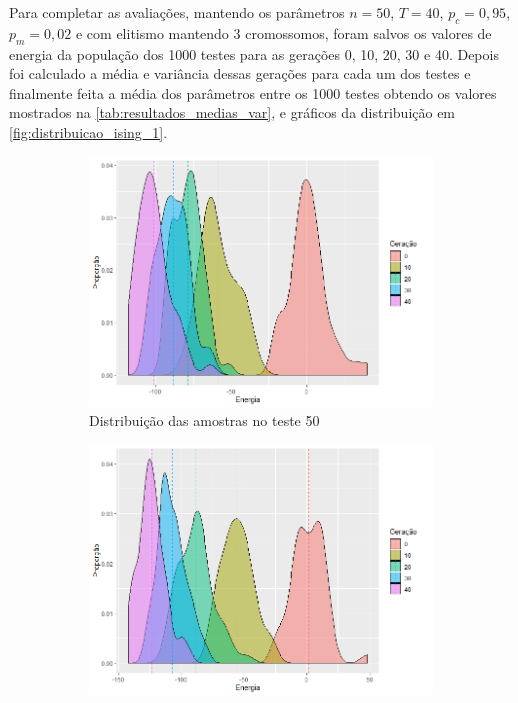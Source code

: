 Para completar as avaliações, mantendo os parâmetros \(n = 50\), \(T = 40\), \(p_c = 0,95\), \(p_m = 0,02\) e com elitismo mantendo 3 cromossomos, foram salvos os valores de energia da população dos 1000 testes para as gerações 0, 10, 20, 30 e 40. Depois foi calculado a média e variância dessas gerações para cada um dos testes e finalmente feita a média dos parâmetros entre os 1000 testes obtendo os valores mostrados na \autoref{tab:resultados_medias_var}, e gráficos da distribuição em \autoref{fig:distribuicao_ising_1}.

\begin{figure}[h!]
	\centering
	\begin{subfigure}[b]{0.47\linewidth}
		\includegraphics[width=\linewidth]{imagens/distribuicao_t50.png}
		\caption{Distribuição das amostras no teste 50}
	\end{subfigure}
	\begin{subfigure}[b]{0.47\linewidth}
		\includegraphics[width=\linewidth]{imagens/distribuicao_t491.png}

\end{subfigure}
\end{figure}
